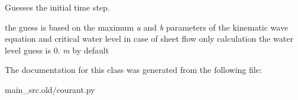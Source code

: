 Guesses the initial time step. 

the guess is based on the maximum {\itshape a} and {\itshape b} parameters of the kinematic wave equation and critical water level in case of sheet flow only calculation the water level guess is 0. {\itshape m} by default 

The documentation for this class was generated from the following file\-:\begin{DoxyCompactItemize}
\item 
main\-\_\-src.\-old/courant.\-py\end{DoxyCompactItemize}
